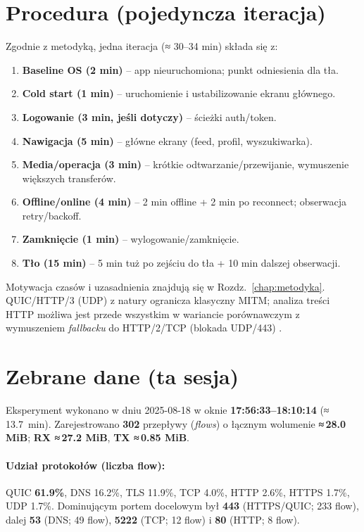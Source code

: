 \section{Procedura (pojedyncza iteracja)}
Zgodnie z metodyką, jedna iteracja (≈ 30–34 min) składa się z: 
\begin{enumerate}
  \item \textbf{Baseline OS (2 min)} – app nieuruchomiona; punkt odniesienia dla tła.
  \item \textbf{Cold start (1 min)} – uruchomienie i ustabilizowanie ekranu głównego.
  \item \textbf{Logowanie (3 min, jeśli dotyczy)} – ścieżki auth/token.
  \item \textbf{Nawigacja (5 min)} – główne ekrany (feed, profil, wyszukiwarka).
  \item \textbf{Media/operacja (3 min)} – krótkie odtwarzanie/przewijanie, wymuszenie większych transferów.
  \item \textbf{Offline/online (4 min)} – 2 min offline + 2 min po reconnect; obserwacja retry/backoff.
  \item \textbf{Zamknięcie (1 min)} – wylogowanie/zamknięcie.
  \item \textbf{Tło (15 min)} – 5 min tuż po zejściu do tła + 10 min dalszej obserwacji.
\end{enumerate}
Motywacja czasów i uzasadnienia znajdują się w Rozdz.\ \ref{chap:metodyka}. QUIC/HTTP/3 (UDP) z natury ogranicza klasyczny MITM; analiza treści HTTP możliwa jest przede wszystkim w wariancie porównawczym z wymuszeniem \emph{fallbacku} do HTTP/2/TCP (blokada UDP/443) \cite{RFC9114}.

\section{Zebrane dane (ta sesja)}
Eksperyment wykonano w dniu 2025-08-18 w oknie \textbf{17{:}56{:}33–18{:}10{:}14} (≈ \SI{13.7}{\minute}). Zarejestrowano \textbf{302} przepływy (\emph{flows}) o łącznym wolumenie \textbf{≈\,28.0 MiB}; \textbf{RX ≈\,27.2 MiB}, \textbf{TX ≈\,0.85 MiB}.

\paragraph{Udział protokołów (liczba flow):}
QUIC \textbf{61.9\%}, DNS 16.2\%, TLS 11.9\%, TCP 4.0\%, HTTP 2.6\%, HTTPS 1.7\%, UDP 1.7\%.
Dominującym portem docelowym był \textbf{443} (HTTPS/QUIC; 233 flow), dalej \textbf{53} (DNS; 49 flow), \textbf{5222} (TCP; 12 flow) i \textbf{80} (HTTP; 8 flow).

